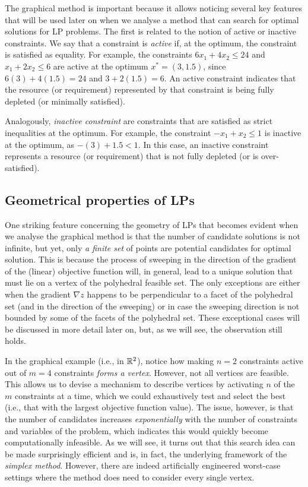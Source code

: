 The graphical method is important because it allows noticing several key features that will be used later on when we analyse a method that can search for optimal solutions for LP problems. The first is related to the notion of active or inactive constraints. We say that a constraint is \emph{active} if, at the optimum, the constraint is satisfied as equality. For example, the constraints $6x_1 + 4x_2 \leq 24$ and $x_1 + 2x_2 \leq 6$ are active at the optimum $x^* = (3, 1.5)$, since $6(3) + 4(1.5) = 24$ and $3 + 2(1.5) = 6$. An active constraint indicates that the resource (or requirement) represented by that constraint is being fully depleted (or minimally satisfied). 

Analogously, \emph{inactive constraint} are constraints that are satisfied as strict inequalities at the optimum. For example, the constraint $-x_1 + x_2 \leq 1$ is inactive at the optimum, as $-(3) + 1.5 < 1$. In this case, an inactive constraint represents a resource (or requirement) that is not fully depleted (or is over-satisfied).


\subsection{Geometrical properties of LPs}

One striking feature concerning the geometry of LPs that becomes evident when we analyse the graphical method is that the number of candidate solutions is not infinite, but yet, only \emph{a finite set} of points are potential candidates for optimal solution. This is because the process of sweeping in the direction of the gradient of the (linear) objective function will, in general, lead to a unique solution that must lie on a vertex of the polyhedral feasible set. The only exceptions are either when the gradient $\nabla z$ happens to be perpendicular to a facet of the polyhedral set (and in the direction of the sweeping) or in case the sweeping direction is not bounded by some of the facets of the polyhedral set. These exceptional cases will be discussed in more detail later on, but, as we will see, the observation still holds.

In the graphical example (i.e., in $\mathbb{R}^2$), notice how making $n = 2$ constraints active out of $m = 4$ constraints \emph{forms a vertex}. However, not all vertices are feasible. This allows us to devise a mechanism to describe vertices by activating $n$ of the $m$ constraints at a time, which we could exhaustively test and select the best (i.e., that with the largest objective function value). The issue, however, is that the number of candidates increases \emph{exponentially} with the number of constraints and variables of the problem, which indicates this would quickly become computationally infeasible. As we will see, it turns out that this search idea can be made surprisingly efficient and is, in fact, the underlying framework of the \emph{simplex method}. However, there are indeed artificially engineered worst-case settings where the method does need to consider every single vertex.

